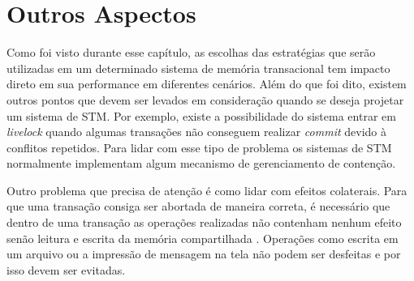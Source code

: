 \section{Outros Aspectos}

Como foi visto durante esse capítulo, as escolhas das estratégias que serão utilizadas em um determinado sistema de memória transacional tem impacto direto em sua performance em diferentes cenários. Além do que foi dito, existem outros pontos que devem ser levados em consideração quando se deseja projetar um sistema de STM. Por exemplo, existe a possibilidade do sistema entrar em \emph{livelock} quando algumas transações não conseguem realizar \emph{commit} devido à conflitos repetidos. Para lidar com esse tipo de problema os sistemas de STM normalmente implementam algum mecanismo de gerenciamento de contenção. \cite{spear2006conflict}

Outro problema que precisa de atenção é como lidar com efeitos colaterais. Para que uma transação consiga ser abortada de maneira correta, é necessário que dentro de uma transação as operações realizadas não contenham nenhum efeito senão leitura e escrita da memória compartilhada \cite{jones2007beautiful}. Operações como escrita em um arquivo ou a impressão de mensagem na tela não podem ser desfeitas e por isso devem ser evitadas.